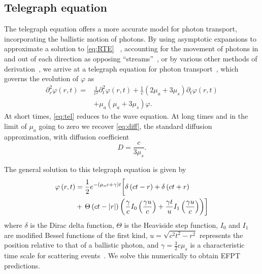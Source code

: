 \subsection{Telegraph equation}\label{subsec:teleg} 
The telegraph equation  offers a more accurate model for photon transport, incorporating the ballistic motion of photons. By using asymptotic expansions to approximate a solution to \eqref{eq:RTE} ~\cite{heizler_asymptotic_2012, hoenders_telegraphers_2005, gombosi_telegraph_1993}, accounting for the movement of photons in and out of each direction as opposing ``streams''~\cite{schuster_radiation_1905,durian_two-stream_1996,lemieux_diffusing-light_1998,masoliver_solutions_1992}, or by various other methods of derivation~\cite{goldstein_diffusion_1951,dudko_photon_2005,masoliver_finite-velocity_1996,weiss_first_1984,weiss_applications_2002}, we arrive at a telegraph equation for photon transport~\cite{lemieux_diffusing-light_1998}, which governs the evolution of $\varphi$ as
\begin{align}
     \partial_{r}^{2} \varphi \left(r,t\right)  = &\frac{1}{c^{2}}\partial^{2}_{t} \varphi\left(r,t\right) + \frac{1}{c}\left(2 \mu_{a} + 3 \mu_{s} \right) \partial_{t} \varphi\left(r,t\right) \nonumber \\
    &+ \mu_{a}\left(\mu_{a} + 3 \mu_{s} \right) \varphi. \label{eq:tel}
\end{align}
At short times, \eqref{eq:tel} reduces to the wave equation. At long times and in the limit of $\mu_{a}$ going to zero we recover \eqref{eq:diff}, the standard diffusion approximation, with diffusion coefficient~\cite{lemieux_diffusing-light_1998}
\begin{equation}\label{eq:telD}
    D = \frac{c}{3\mu_{s}}.
\end{equation}

The general solution to this telegraph equation is given by~\cite{goldstein_diffusion_1951,durian_photon_1997}
%
\begin{align}
    \varphi \left(r,t\right) &= \frac{1}{2} e^{-\left(\mu_{a}c + \gamma \right)t} \bigg[\delta \left(c t - r\right) + \delta\left(ct + r\right) \notag\\
    &+\left. \Theta\left(c t - |r|\right) \left(\frac{\gamma}{c}I_{0}\left(\frac{\gamma u}{c}\right) + \frac{\gamma t}{u}I_{1}\left(\frac{\gamma u}{c}\right)\right)\right]
\end{align}
%
where $\delta$ is the Dirac delta function, $\Theta$ is the Heaviside step function, $I_{0}$ and $I_{1}$ are modified Bessel functions of the first kind, $u=\sqrt{c^{2}t^{2}-r^{2}}$ represents the position relative to that of a ballistic photon, and $\gamma = \frac{3}{2} c \mu_{s}$ is a characteristic time scale for scattering events~\cite{goldstein_diffusion_1951,masoliver_solution_1993,masoliver_telegraphers_1994,masoliver_finite-velocity_1996}. We solve this numerically to obtain EFPT predictions.

